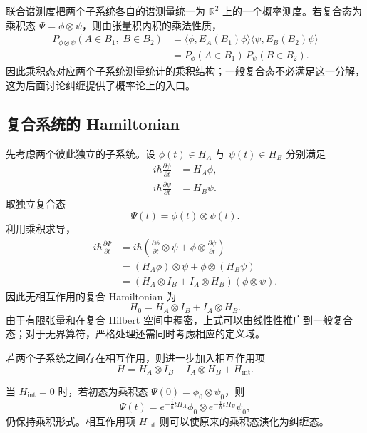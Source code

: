 \documentclass[UTF8,a4paper,11pt,openany]{ctexbook}
\begin{document}
联合谱测度把两个子系统各自的谱测量统一为 $\mathbb R^2$ 上的一个概率测度。若复合态为乘积态 $\Psi=\phi\otimes\psi$，则由张量积内积的乘法性质，
\begin{align}
    P_{\phi\otimes\psi}(A\in B_1,\;B\in B_2)
    &=
    \langle\phi,E_A(B_1)\phi\rangle
    \langle\psi,E_B(B_2)\psi\rangle
    \nonumber\\
    &=
    P_\phi(A\in B_1)\,
    P_\psi(B\in B_2).
\end{align}
因此乘积态对应两个子系统测量统计的乘积结构；一般复合态不必满足这一分解，这为后面讨论纠缠提供了概率论上的入口。

\subsection{复合系统的 Hamiltonian}

先考虑两个彼此独立的子系统。设
$\phi(t)\in H_A$ 与 $\psi(t)\in H_B$ 分别满足
\begin{align}
    i\hbar\frac{\partial\phi}{\partial t}
    &=H_A\phi,
    \nonumber\\
    i\hbar\frac{\partial\psi}{\partial t}
    &=H_B\psi.
\end{align}
取独立复合态
\[
\Psi(t)=\phi(t)\otimes\psi(t).
\]
利用乘积求导，
\begin{align}
    i\hbar\frac{\partial\Psi}{\partial t}
    &=
    i\hbar
    \left(
        \frac{\partial\phi}{\partial t}\otimes\psi
        +
        \phi\otimes\frac{\partial\psi}{\partial t}
    \right)
    \nonumber\\
    &=
    (H_A\phi)\otimes\psi
    +
    \phi\otimes(H_B\psi)
    \nonumber\\
    &=
    \left(
        H_A\otimes I_B
        +
        I_A\otimes H_B
    \right)
    (\phi\otimes\psi).
\end{align}
因此无相互作用的复合 Hamiltonian 为
\begin{equation}
    H_0
    =
    H_A\otimes I_B
    +
    I_A\otimes H_B.
\end{equation}
由于有限张量和在复合 Hilbert 空间中稠密，上式可以由线性性推广到一般复合态；对于无界算符，严格处理还需同时考虑相应的定义域。

若两个子系统之间存在相互作用，则进一步加入相互作用项
\begin{equation}
    H
    =
    H_A\otimes I_B
    +
    I_A\otimes H_B
    +
    H_{\mathrm{int}}.
\end{equation}

当 $H_{\mathrm{int}}=0$ 时，若初态为乘积态
$\Psi(0)=\phi_0\otimes\psi_0$，则
\begin{equation}
    \Psi(t)
    =
    e^{-\frac{i}{\hbar}tH_A}\phi_0
    \otimes
    e^{-\frac{i}{\hbar}tH_B}\psi_0,
\end{equation}
仍保持乘积形式。相互作用项 $H_{\mathrm{int}}$ 则可以使原来的乘积态演化为纠缠态。
\end{document}
